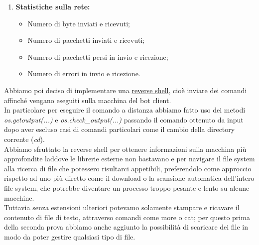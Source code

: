 \documentclass[a4paper]{report}
\begin{document}
\begin{enumerate}
	\item \textbf{Statistiche sulla rete:}
	\begin{itemize}
		\item Numero di byte inviati e ricevuti;
		\item Numero di pacchetti inviati e ricevuti;
		\item Numero di pacchetti persi in invio e ricezione;
		\item Numero di errori in invio e ricezione.
	\end{itemize}
	
\end{enumerate}

Abbiamo poi deciso di implementare una \underline{reverse shell}, cioè inviare dei comandi affinché vengano eseguiti sulla macchina del bot client.\\
In particolare per eseguire il comando a distanza abbiamo fatto uso dei metodi \textit{os.getoutput(...)} e \textit{os.check\_output(...)} passando il comando ottenuto da input dopo aver escluso casi di comandi particolari come il cambio della directory corrente (\textit{cd}).\\
Abbiamo sfruttato la reverse shell per ottenere informazioni sulla macchina più approfondite laddove le librerie esterne non bastavano e per navigare il file system alla ricerca di file che potessero risultarci appetibili, preferendolo come approccio rispetto ad uno più diretto come il download o la scansione automatica dell'intero file system, che potrebbe diventare un processo troppo pesante e lento su alcune macchine.\\
Tuttavia senza estensioni ulteriori potevamo solamente stampare e ricavare il contenuto di file di testo, attraverso comandi come more o cat; per questo prima della seconda prova abbiamo anche aggiunto la possibilità di scaricare dei file in modo da poter gestire qualsiasi tipo di file.\\
\end{document}
